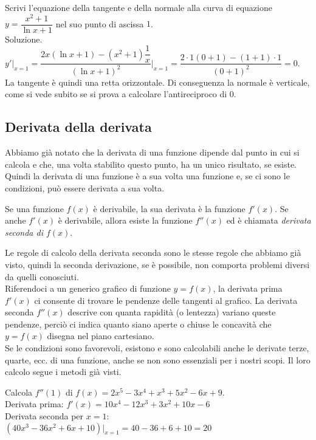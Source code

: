 \begin{esempio}
Scrivi l'equazione della tangente e della normale alla curva di equazione
$y=\dfrac{x^2+1}{\ln x +1}$ nel suo punto di ascissa $1$.\\
Soluzione. $y'|_{x=1}=\dfrac{2x(\ln x+1)-(x^2+1)\dfrac{1}{x}}
{(\ln x +1)^2}\bigg|_{x=1}=\dfrac{2\cdot 1(0+1)-(1+1)\cdot 1}{(0+1)^2}=0$.\\
La tangente è quindi una retta orizzontale. Di conseguenza la normale è 
verticale, come si vede subito se si prova a calcolare l'antireciproco di $0$.
\end{esempio}

\subsection{Derivata della derivata}
\label{}
Abbiamo già notato che la derivata  di una funzione dipende dal punto in cui si 
calcola e che, una volta stabilito questo punto, ha un unico risultato,
se esiste.
Quindi la derivata di una funzione è a sua volta una funzione e,
se ci sono le condizioni, può essere derivata a sua volta.
\begin{definizione}
 Se una funzione $f(x)$ è derivabile, la sua derivata è la funzione $f'(x)$.
 Se anche $f'(x)$ è derivabile, allora esiste la funzione $f''(x)$ ed è
 chiamata \emph{derivata seconda di $f(x)$}.
\end{definizione}
Le regole di calcolo della derivata seconda sono le stesse regole che abbiamo 
già visto, quindi la seconda derivazione, se è possibile, non comporta problemi 
diversi da quelli conosciuti.\\
Riferendoci a un generico grafico di funzione $y=f(x)$, la derivata prima 
$f'(x)$ ci consente di trovare le pendenze delle tangenti al grafico. La
derivata seconda $f''(x)$ descrive con quanta rapidità (o lentezza) variano 
queste pendenze, perciò ci indica quanto siano aperte o chiuse le concavità che
$y=f(x)$ disegna nel piano cartesiano.\\
Se le condizioni sono favorevoli, esistono e sono calcolabili anche le derivate 
terze, quarte, ecc. di una funzione, anche se non sono essenziali per i nostri 
scopi. Il loro calcolo segue i metodi già visti.

\begin{esempio}
Calcola $f''(1)$ di $f(x)=2x^5-3x^4+x^3+5x^2-6x+9$.\\
Derivata prima: $f'(x)=10 x^4-12 x^3+3x^2+10 x-6$\\
Derivata seconda per $x=1$: $(40x^3-36x^2+6x+10)|_{x=1}=40-36+6+10=20$
\end{esempio}

